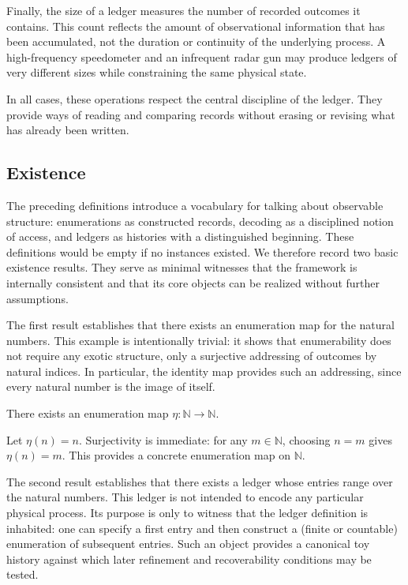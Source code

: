 Finally, the size of a ledger measures the number of recorded outcomes it
contains. This count reflects the amount of observational information that has
been accumulated, not the duration or continuity of the underlying process. A
high-frequency speedometer and an infrequent radar gun may produce ledgers of
very different sizes while constraining the same physical state.

In all cases, these operations respect the central discipline of the ledger.
They provide ways of reading and comparing records without erasing or revising
what has already been written.

\subsection{Existence}

The preceding definitions introduce a vocabulary for talking about observable
structure: enumerations as constructed records, decoding as a disciplined notion
of access, and ledgers as histories with a distinguished beginning. These
definitions would be empty if no instances existed. We therefore record two
basic existence results. They serve as minimal witnesses that the framework is
internally consistent and that its core objects can be realized without further
assumptions.

The first result establishes that there exists an enumeration map for the
natural numbers. This example is intentionally trivial: it shows that
enumerability does not require any exotic structure, only a surjective
addressing of outcomes by natural indices. In particular, the identity map
provides such an addressing, since every natural number is the image of itself.

\begin{proposition}
\label{prop:exists-enum-nat}
There exists an enumeration map $\eta : \mathbb{N} \to \mathbb{N}$.
\end{proposition}

\begin{proofsketch}
Let $\eta(n) = n$. Surjectivity is immediate: for any $m \in \mathbb{N}$, choosing
$n=m$ gives $\eta(n)=m$. This provides a concrete enumeration map on
$\mathbb{N}$.
\end{proofsketch}

The second result establishes that there exists a ledger whose entries range
over the natural numbers. This ledger is not intended to encode any particular
physical process. Its purpose is only to witness that the ledger definition is
inhabited: one can specify a first entry and then construct a (finite or
countable) enumeration of subsequent entries. Such an object provides a
canonical toy history against which later refinement and recoverability
conditions may be tested.

